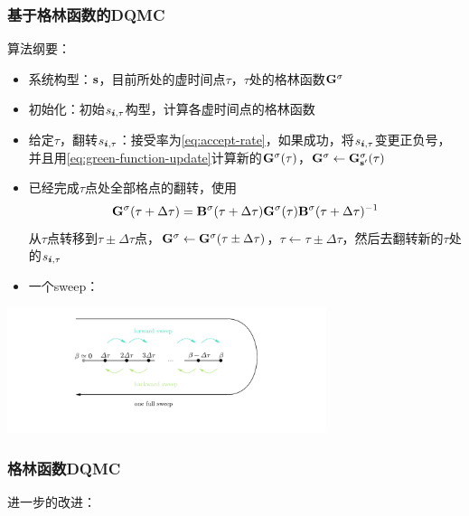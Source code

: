 \documentclass[UTF8]{ctexbeamer}
\begin{document}
\begin{frame}
\frametitle{基于格林函数的DQMC}

算法纲要：
\begin{itemize}
    \item 系统构型：$\vb{s}$，目前所处的虚时间点$\tau$，$\tau$处的格林函数$\vb{G}^\sigma$
    \item 初始化：初始$s_{\vb*{i}, \tau}$构型，计算各虚时间点的格林函数
    \item 给定$\tau$，翻转$s_{\vb*{i}, \tau}$：接受率为\eqref{eq:accept-rate}，如果成功，将$s_{\vb*{i}, \tau}$变更正负号，并且用\eqref{eq:green-function-update}计算新的$\vb{G}^\sigma(\tau)$，$\vb{G}^\sigma \leftarrow \vb{G}^\sigma_{\vb{s}'}(\tau)$
    \item 已经完成$\tau$点处全部格点的翻转，使用
    \begin{equation}
        \vb{G}^\sigma(\tau + \Delta \tau) = \vb{B}^\sigma(\tau + \Delta \tau) \vb{G}^\sigma(\tau) \vb{B}^\sigma(\tau + \Delta \tau)^{-1}
    \end{equation}
    从$\tau$点转移到$\tau \pm \Delta \tau$点，$\vb{G}^\sigma \leftarrow \vb{G}^\sigma(\tau \pm \Delta \tau)$，$\tau \leftarrow \tau \pm \Delta \tau$，然后去翻转新的$\tau$处的$s_{\vb*{i}, \tau}$
    \item 一个sweep：
\end{itemize}

\begin{center}
    \includegraphics[width=0.7\textwidth]{sweeping.pdf}
\end{center}

\end{frame}

\begin{frame}
\frametitle{格林函数DQMC}

进一步的改进：


\end{frame}
\end{document}
